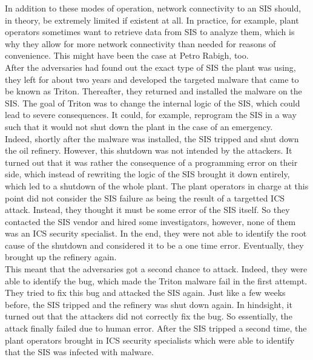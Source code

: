 \documentclass[runningheads]{llncs}
\begin{document}
In addition to these modes of operation, network connectivity to an SIS should, in theory, be extremely limited if existent at all.
In practice, for example, plant operators sometimes want to retrieve data from SIS to analyze them, which is why they allow for more network connectivity than needed for reasons of convenience.
This might have been the case at Petro Rabigh, too.
\cite{dragos.17}\\
After the adversaries had found out the exact type of SIS the plant was using, they left for about two years and developed the targeted malware that came to be known as Triton.
Thereafter, they returned and installed the malware on the SIS.
The goal of Triton was to change the internal logic of the SIS, which could lead to severe consequences.
It could, for example, reprogram the SIS in a way such that it would not shut down the plant in the case of an emergency. \cite{lee.20}\\
Indeed, shortly after the malware was installed, the SIS tripped and shut down the oil refinery.
However, this shutdown was not intended by the attackers.
It turned out that it was rather the consequence of a programming error on their side, which instead of rewriting the logic of the SIS brought it down entirely, which led to a shutdown of the whole plant.
The plant operators in charge at this point did not consider the SIS failure as being the result of a targetted ICS attack.
Instead, they thought it must be some error of the SIS itself.
So they contacted the SIS vendor and hired some investigators, however, none of them was an ICS security specialist.
In the end, they were not able to identify the root cause of the shutdown and considered it to be a one time error.
Eventually, they brought up the refinery again. \cite{lee.20}\\
This meant that the adversaries got a second chance to attack.
Indeed, they were able to identify the bug, which made the Triton malware fail in the first attempt.
They tried to fix this bug and attacked the SIS again.
Just like a few weeks before, the SIS tripped and the refinery was shut down again.
In hindsight, it turned out that the attackers did not correctly fix the bug.
So essentially, the attack finally failed due to human error.
After the SIS tripped a second time, the plant operators brought in ICS security specialists which were able to identify that the SIS was infected with malware.
\end{document}
